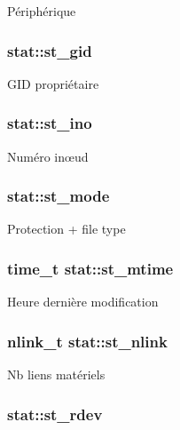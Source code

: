 \-Périphérique \hypertarget{structstat_ab864f16f436cec370f0ced585d897698}{
\subsubsection[{st\-\_\-gid}]{ {\bf stat\-::st\-\_\-gid}}}\label{structstat_ab864f16f436cec370f0ced585d897698}
\-G\-I\-D propriétaire \hypertarget{structstat_a9769ed8f0d4c5a9f329c32bc92479d56}{
\subsubsection[{st\-\_\-ino}]{ {\bf stat\-::st\-\_\-ino}}}\label{structstat_a9769ed8f0d4c5a9f329c32bc92479d56}
\-Numéro inœud \hypertarget{structstat_a5cbdd829011af82ba61e83773bbcbc7d}{
\subsubsection[{st\-\_\-mode}]{ {\bf stat\-::st\-\_\-mode}}}\label{structstat_a5cbdd829011af82ba61e83773bbcbc7d}
\-Protection + file type \hypertarget{structstat_a77e235090f8cb6897f1c0ce65689006b}{
\subsubsection[{st\-\_\-mtime}]{\setlength{\rightskip}{0pt plus 5cm}time\-\_\-t {\bf stat\-::st\-\_\-mtime}}}\label{structstat_a77e235090f8cb6897f1c0ce65689006b}
\-Heure dernière modification \hypertarget{structstat_a0ed9092fa6c77a3251b9b9a4738ef84f}{
\subsubsection[{st\-\_\-nlink}]{\setlength{\rightskip}{0pt plus 5cm}nlink\-\_\-t {\bf stat\-::st\-\_\-nlink}}}\label{structstat_a0ed9092fa6c77a3251b9b9a4738ef84f}
\-Nb liens matériels \hypertarget{structstat_aa61e6c1a8a91c69f1d26f6700a0546cb}{
\subsubsection[{st\-\_\-rdev}]{ {\bf stat\-::st\-\_\-rdev}}}\label{structstat_aa61e6c1a8a91c69f1d26f6700a0546cb}
